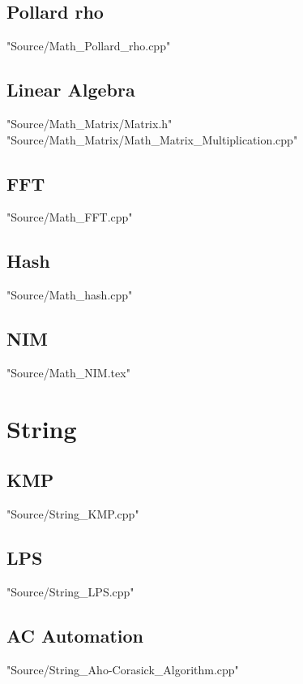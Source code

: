 \documentclass [10pt,twocolumn,oneside]{article}
\begin{document}
\subsection{Pollard rho}
 {"Source/Math_Pollard_rho.cpp"}

\subsection{Linear Algebra}
 {"Source/Math_Matrix/Matrix.h"}
 {"Source/Math_Matrix/Math_Matrix_Multiplication.cpp"}

\subsection{FFT}
 {"Source/Math_FFT.cpp"}

\subsection{Hash}
 {"Source/Math_hash.cpp"}

\subsection{NIM}
 {"Source/Math_NIM.tex"}





\section{String}
\subsection{KMP}
 {"Source/String_KMP.cpp"}

\subsection{LPS}
 {"Source/String_LPS.cpp"}

\subsection{AC Automation}
 {"Source/String_Aho-Corasick_Algorithm.cpp"}
\end{document}
